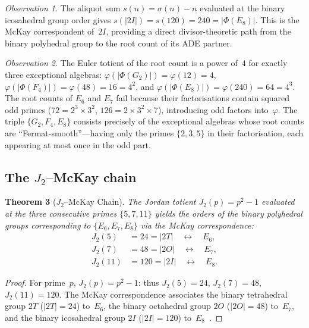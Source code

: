 \documentclass[11pt]{amsart}
\theoremstyle{plain}
\newtheorem{theorem}{Theorem}[section]
\theoremstyle{definition}
\theoremstyle{remark}
\newtheorem{observation}[theorem]{Observation}
\renewcommand{\Phi}{\varPhi}
\begin{document}
\begin{observation}\label{obs:aliquot-E8}
The aliquot sum $s(n) = \sigma(n) - n$ evaluated at the binary
icosahedral group order gives
$s(|2I|) = s(120) = 240 = |\Phi(E_8)|$.
This is the McKay correspondent of~$2I$, providing a direct
divisor-theoretic path from the binary polyhedral group to the root
count of its ADE partner.
\end{observation}

\begin{observation}\label{obs:phi-roots-power4}
The Euler totient of the root count is a power of~$4$ for exactly three
exceptional algebras:
$\varphi(|\Phi(G_2)|) = \varphi(12) = 4$,
$\varphi(|\Phi(F_4)|) = \varphi(48) = 16 = 4^2$, and
$\varphi(|\Phi(E_8)|) = \varphi(240) = 64 = 4^3$.
The root counts of $E_6$ and $E_7$ fail because their
factorisations contain squared odd primes ($72 = 2^3 \times 3^2$,
$126 = 2 \times 3^2 \times 7$), introducing odd factors into~$\varphi$.
The triple $\{G_2, F_4, E_8\}$ consists precisely of the exceptional
algebras whose root counts are ``Fermat-smooth''---having only the
primes $\{2, 3, 5\}$ in their factorisation, each appearing at most
once in the odd part.
\end{observation}

\subsection{The $J_2$--McKay chain}

\begin{theorem}[$J_2$--McKay Chain]\label{thm:J2McKay}
The Jordan totient $J_2(p) = p^2 - 1$ evaluated at the three
consecutive primes $\{5, 7, 11\}$ yields the orders of the binary
polyhedral groups corresponding to $\{E_6, E_7, E_8\}$ via the McKay
correspondence:
\begin{align*}
  J_2(5)  &= 24  = |2T| \quad \leftrightarrow \quad E_6, \\
  J_2(7)  &= 48  = |2O| \quad \leftrightarrow \quad E_7, \\
  J_2(11) &= 120 = |2I| \quad \leftrightarrow \quad E_8.
\end{align*}
\end{theorem}

\begin{proof}
For prime~$p$, $J_2(p) = p^2 - 1$: thus $J_2(5) = 24$, $J_2(7) = 48$,
$J_2(11) = 120$.  The McKay correspondence associates the binary
tetrahedral group $2T$ ($|2T| = 24$) to~$E_6$, the binary octahedral
group $2O$ ($|2O| = 48$) to~$E_7$, and the binary icosahedral
group $2I$ ($|2I| = 120$) to~$E_8$~\cite{McKay1980,Zuber1998}.
\end{proof}
\end{document}
